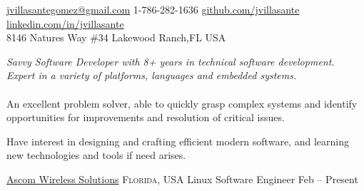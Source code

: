 \documentclass[10pt,a4paper]{article}
\begin{document}
\sloppy  %



\nobreakvspace{0.3em}  %

\noindent\href{mailto:jvillasantegomez.at.gmail.dot.com}{jvillasantegomez\mbox{}@\mbox{}gmail.com}\sbull
\textsmaller{+}1-786-282-1636\sbull
\href{https://github.com/jvillasante}{github.com/jvillasante}\sbull
\href{http://linkedin.com/in/jvillasante}{linkedin.com/in/jvillasante}
\\
8146 Natures Way {\sc \#34}\sbull
Lakewood Ranch,\thinspace FL\sbull
{\large {}}\sbull
USA

\spacedhrule{0.9em}{-0.4em}  %


\vspace{-1.3em}  %
\begin{multicols}{2}  %
\noindent \emph{Savvy Software Developer with 8+ years in technical software development. Expert in a variety of platforms, languages and embedded systems.}
\\
\\
An excellent problem solver, able to quickly grasp complex systems and identify opportunities for improvements and resolution of critical issues.

Have interest in designing and crafting efficient modern software, and learning new technologies and tools if need arises.
\end{multicols}

\spacedhrule{0em}{-0.4em}


\headedsection
  {\href{http://www.ascom.us/}{Ascom Wireless Solutions}}
  {\textsc{Florida, USA}} {%
  \headedsubsection
    {Linux Software Engineer}
    {Feb  -- Present}
    {}
}
\end{document}

